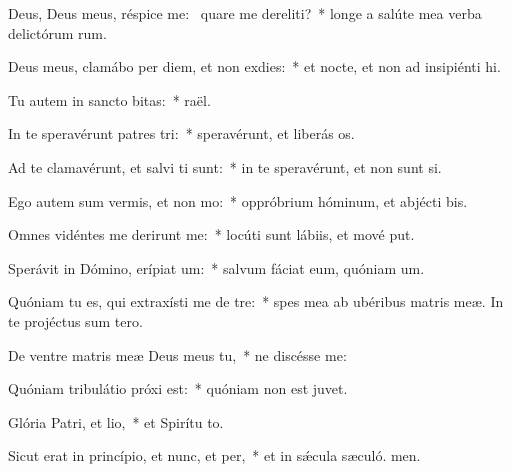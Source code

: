 \item Deus, Deus meus, réspice  me:~\pscross{} quare me dereliti?~* longe a salúte mea verba delictórum rum.
\item Deus meus, clamábo per diem, et non exdies:~* et nocte, et non ad insipiénti hi.
\item Tu autem in sancto bitas:~*  raël.
\item In te speravérunt patres tri:~* speravérunt, et liberás os.
\item Ad te clamavérunt, et salvi ti sunt:~* in te speravérunt, et non sunt si.
\item Ego autem sum vermis, et non mo:~* oppróbrium hóminum, et abjécti bis.
\item Omnes vidéntes me derirunt me:~* locúti sunt lábiis, et mové put.
\item Sperávit in Dómino, erípiat um:~* salvum fáciat eum, quóniam  um.
\item Quóniam tu es, qui extraxísti me de tre:~* spes mea ab ubéribus matris meæ. In te projéctus sum  tero.
\item De ventre matris meæ Deus meus  tu,~* ne discésse  me:
\item Quóniam tribulátio próxi est:~* quóniam non est  juvet.
\item Glória Patri, et lio,~* et Spirítu to.
\item Sicut erat in princípio, et nunc, et per,~* et in sǽcula sæculó. men.
